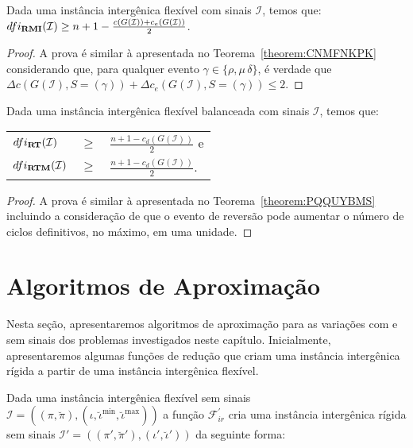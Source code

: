 \begin{theorem}\label{theorem:XQPRYMFX}
Dada uma instância intergênica flexível com sinais $\mathcal{I}$, temos que:\break $dfi_{\textbf{RMI}}(\mathcal{I}) \ge {n+1} - \frac{c(G(\mathcal{I} )) + c_e(G(\mathcal{I} ))}{2}$.
\end{theorem}
\begin{proof}
A prova é similar à apresentada no Teorema~\ref{theorem:CNMFNKPK} considerando que, para qualquer evento $\gamma \in \{\rho, \mu\,\delta\}$, é verdade que $\Delta c(G(\mathcal{I}), S=(\gamma)) + \Delta c_e(G(\mathcal{I}), S=(\gamma)) \le 2$.
\end{proof}

\begin{theorem}\label{theorem:HELIIGVZ}
Dada uma instância intergênica flexível balanceada com sinais $\mathcal{I}$, temos que:

\begin{tabular}{lll}
  $dfi_{\textbf{RT}}(\mathcal{I})$     & $ \ge $ & $\frac{{n+1} - c_d(G(\mathcal{I} ))}{2}$ e \\
  $dfi_{\textbf{RTM}}(\mathcal{I})$    & $ \ge $ & $\frac{{n+1} - c_d(G(\mathcal{I} ))}{2}$.  \\
\end{tabular}
\end{theorem}
\begin{proof}
A prova é similar à apresentada no Teorema~\ref{theorem:PQQUYBMS} incluindo a consideração de que o evento de reversão pode aumentar o número de ciclos definitivos, no máximo, em uma unidade.
\end{proof}

\section{Algoritmos de Aproximação}

Nesta seção, apresentaremos algoritmos de aproximação para as variações com e sem sinais dos problemas investigados neste capítulo. Inicialmente, apresentaremos algumas funções de redução que criam uma instância intergênica rígida a partir de uma instância intergênica flexível.

Dada uma instância intergênica flexível sem sinais $\mathcal{I} = ((\pi,\breve\pi),(\iota,\breve\iota^{\min},\breve\iota^{\max}))$ a função $\mathcal{F}_{ir}^{'}$ cria uma instância intergênica rígida sem sinais $\mathcal{I'} = ((\pi',\breve\pi'),(\iota',\breve\iota'))$ da seguinte forma:

